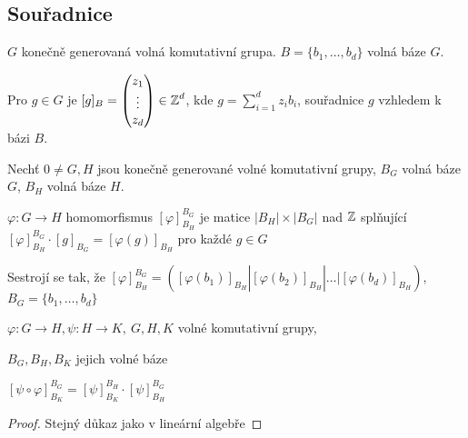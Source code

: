 \subsection{Souřadnice}
$G$ konečně generovaná volná komutativní grupa. $B = \{b_1, \dots, b_d\}$ volná báze $G$.

Pro $g \in G$ je $[g]_B = \begin{pmatrix}
z_1 \\
\vdots \\
z_d
\end{pmatrix} \in \operatorname{\mathbb{Z}}^d$, kde $g = \sum_{i = 1}^d z_ib_i$, souřadnice $g$ vzhledem k bázi $B$.

\begin{definition}
Nechť $0 \neq G,H$ jsou konečně generované volné komutativní grupy, $B_G$ volná báze $G$, $B_H$ volná báze $H$.

$\varphi: G \rightarrow H$ homomorfismus $[\varphi]_{B_H}^{B_G}$ je matice $|B_H| \times |B_G|$ nad $\operatorname{\mathbb{Z}}$ 
splňující $[\varphi]_{B_H}^{B_G}\cdot[g]_{B_G}=[\varphi(g)]_{B_H}$ pro každé $g\in G$
\end{definition}

Sestrojí se tak, že $[\varphi]_{B_H}^{B_G} = ([\varphi(b_1)]_{B_H}|[\varphi(b_2)]_{B_H}| \dots | [\varphi(b_d)]_{B_H})$, $B_G=\{b_1,\ldots,b_d\}$

\begin{claim}
$\varphi:G\rightarrow H,\psi:H\rightarrow K,\ G,H,K$ volné komutativní grupy,

$B_G, B_H, B_K$ jejich volné báze

$[\psi \circ \varphi]_{B_K}^{B_G} = [\psi]_{B_K}^{B_H} \cdot [\psi]_{B_H}^{B_G}$
\end{claim}
\begin{proof}
Stejný důkaz jako v lineární algebře
\end{proof}